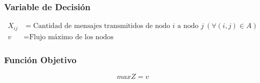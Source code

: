 \documentclass[a4paper,12pt]{article}
\begin{document}
\subsubsection{Variable de Decisión}
\begin{equation*}
\begin{split}
	X_{ij} &= \text{Cantidad de mensajes transmitidos de nodo } i \text{ a nodo } j \ (\forall(i,j)\in A)\\
	v &= \text{Flujo máximo de los nodos}
\end{split}
\end{equation*}

\subsubsection{Función Objetivo}
\begin{equation*}
	maxZ = v
\end{equation*}
\end{document}
